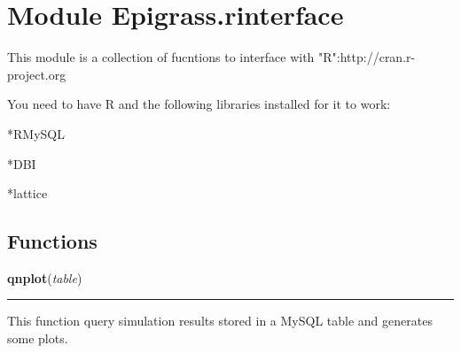 %
%
%


\section{Module Epigrass.rinterface}

    \label{Epigrass:rinterface}
This module is a collection of fucntions to interface with 
"R":http://cran.r-project.org

You need to have R and the following libraries installed for it to work:

*RMySQL

*DBI

*lattice



  \subsection{Functions}

    \label{Epigrass:rinterface:qnplot}

    \vspace{0.5ex}

    \begin{boxedminipage}{\textwidth}

    \raggedright \textbf{qnplot}(\textit{table})

    \vspace{-1.5ex}

    \rule{\textwidth}{0.5\fboxrule}
    This function query simulation results stored in a MySQL table and 
    generates some plots.

    \vspace{1ex}

    \end{boxedminipage}

